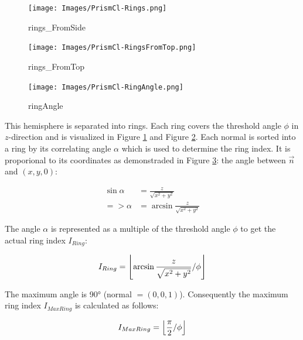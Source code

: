 \documentclass[../ClassicThesis.tex]{subfiles}
\begin{document}
\begin{figure}
    \texttt{[image: Images/PrismCl-Rings.png]}
    \caption{rings_FromSide}
    \label{fig:rings_FromSide}
\end{figure}

\begin{figure}
    \texttt{[image: Images/PrismCl-RingsFromTop.png]}
    \caption{rings_FromTop}
    \label{fig:rings_FromTop}
\end{figure}

\begin{figure}
    \texttt{[image: Images/PrismCl-RingAngle.png]}
    \caption{ringAngle}
    \label{fig:ringAngle}
\end{figure}


This hemisphere is separated into rings. Each ring covers the threshold angle $\phi$ in $z$-direction and is visualized in Figure \ref{fig:rings_FromSide} and Figure \ref{fig:rings_FromTop}. Each normal is sorted into a ring by its correlating angle $\alpha$ which is used to determine the ring index. It is proporional to its coordinates as demonstraded in Figure \ref{fig:ringAngle}: the angle between $\vec{n}$ and $(x,y,0)$:

\begin{equation*}
\begin{split}
    \sin{\alpha} & = \frac{z}{ \sqrt{x^{2} + y^{2}} } \\
    => \alpha  & = \arcsin{ \frac{z}{ \sqrt{x^{2} + y^{2}} } }
\end{split}
\end{equation*}


The angle $\alpha$ is represented as a multiple of the threshold angle $\phi$ to get the actual ring index $I_{Ring}$:

\begin{equation*}
    I_{Ring} = \floor*{
                    \arcsin{
                        \frac{z}{ \sqrt{ x^{2} + y^{2} } }
                    }
                    / \phi
                }
\end{equation*}

The maximum angle is 90° (normal $ = (0,0,1)$). Consequently the maximum ring index $I_{MaxRing}$ is calculated as follows:

\begin{equation*}
    I_{MaxRing} = \floor*{
                    \frac{\pi}{2}
                    / \phi
                  }
\end{equation*}
\end{document}
